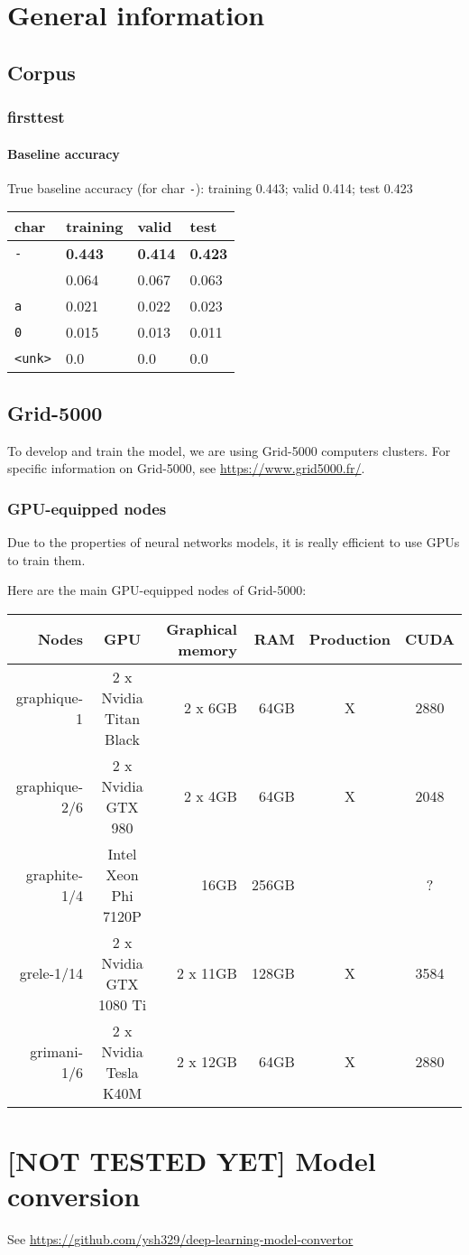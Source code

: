 \section*{General information}

\subsection{Corpus}

\subsubsection{firsttest}

\paragraph{Baseline accuracy}

True baseline accuracy (for char \lstinline!-!): training 0.443; valid
0.414; test 0.423

\begin{longtable}[]{@{}llll@{}}
\hline
char & training & valid & test\tabularnewline
\hline
\endhead
\lstinline!-! & \textbf{0.443} & \textbf{0.414} & \textbf{0.423}\tabularnewline
\lstinline! ! & 0.064&0.067&0.063\tabularnewline
\lstinline!a! & 0.021&0.022&0.023\tabularnewline
\lstinline!0! & 0.015&0.013&0.011\tabularnewline
\lstinline!<unk>! & 0.0&0.0&0.0\tabularnewline
\hline
\end{longtable}

\subsection{Grid-5000}

To develop and train the model, we are using Grid-5000 computers
clusters. For specific information on Grid-5000, see
\href{https://www.grid5000.fr/}{https://www.grid5000.fr/}.

\subsubsection{GPU-equipped nodes}

Due to the properties of neural networks models, it is really efficient
to use GPUs to train them.

Here are the main GPU-equipped nodes of Grid-5000:

\begin{longtable}[]{@{}rcrrcc@{}}
\hline
Nodes & GPU & Graphical memory & RAM & Production & CUDA\tabularnewline
\hline
\endhead
graphique-1 & 2 x Nvidia Titan Black & 2 x 6GB & 64GB & X &
2880\tabularnewline
graphique-2/6 & 2 x Nvidia GTX 980 & 2 x 4GB & 64GB & X &
2048\tabularnewline
graphite-1/4 & Intel Xeon Phi 7120P & 16GB & 256GB & & ?\tabularnewline
grele-1/14 & 2 x Nvidia GTX 1080 Ti & 2 x 11GB & 128GB & X &
3584\tabularnewline
grimani-1/6 & 2 x Nvidia Tesla K40M & 2 x 12GB & 64GB & X &
2880\tabularnewline
\hline
\end{longtable}

\section*{{[}NOT TESTED YET{]} Model conversion}

See 
\href{https://github.com/ysh329/deep-learning-model-convertor}{https://github.com/ysh329/deep-learning-model-convertor}
